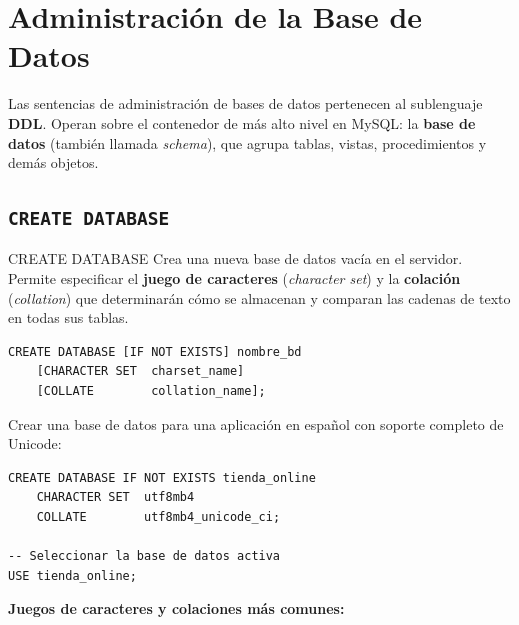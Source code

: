 \newpage
\section{Administración de la Base de Datos}

Las sentencias de administración de bases de datos pertenecen al sublenguaje
\textbf{DDL}. Operan sobre el contenedor de más alto nivel en MySQL: la
\textbf{base de datos} (también llamada \textit{schema}), que agrupa tablas,
vistas, procedimientos y demás objetos.

\subsection{\texttt{CREATE DATABASE}}

\begin{definicion}{CREATE DATABASE}
  Crea una nueva base de datos vacía en el servidor. Permite especificar el
  \textbf{juego de caracteres} (\textit{character set}) y la
  \textbf{colación} (\textit{collation}) que determinarán cómo se almacenan
  y comparan las cadenas de texto en todas sus tablas.
\end{definicion}

\begin{lstlisting}[style=sql, caption={Sintaxis de CREATE DATABASE}]
CREATE DATABASE [IF NOT EXISTS] nombre_bd
    [CHARACTER SET  charset_name]
    [COLLATE        collation_name];
\end{lstlisting}

\begin{ejemplo}
  Crear una base de datos para una aplicación en español con soporte
  completo de Unicode:

\begin{lstlisting}[style=sql, caption={Base de datos con utf8mb4 y collation en español}]
CREATE DATABASE IF NOT EXISTS tienda_online
    CHARACTER SET  utf8mb4
    COLLATE        utf8mb4_unicode_ci;

-- Seleccionar la base de datos activa
USE tienda_online;
\end{lstlisting}
\end{ejemplo}

\textbf{Juegos de caracteres y colaciones más comunes:}

